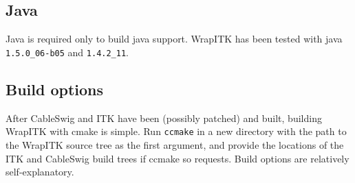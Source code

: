 \documentclass{InsightArticle}
\begin{document}
    \subsection{Java}

Java \cite{JavaWebSite} is required only to build java support.
WrapITK has been tested with java \verb$1.5.0_06-b05$ and \verb$1.4.2_11$.

    \subsection{Build options}

After CableSwig and ITK have been (possibly patched) and built, building WrapITK
with cmake is simple. Run \verb$ccmake$ in a new directory with the path to the WrapITK
source tree as the first argument, and provide the locations of the ITK and
CableSwig build trees if ccmake so requests. Build options are relatively
self-explanatory.
\end{document}
